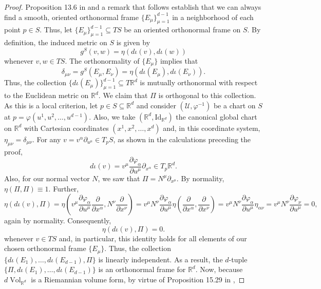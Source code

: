 \documentclass{article}
\newcommand{\p}{\partial}
\newcommand{\R}{\mathbb{R}}
\newcommand{\al}{\alpha}
\newcommand{\f}[2]{\frac{#1}{#2}}
\newcommand{\lp}{\left(}
\newcommand{\rp}{\right)}
\theoremstyle{theorem}
\newcommand{\Vol}{\operatorname{Vol}}
\begin{document}
\begin{proof}


Proposition 13.6 in \cite{lee2013smooth} and a remark that follows establish that we can always find a smooth, oriented orthonormal frame $\{ E_\mu \}_{\mu = 1}^{d-1}$ in a neighborhood of each point  $p\in S$. Thus, let $\{ E_\mu \}_{\mu = 1}^{d-1}\subseteq TS$ be an oriented orthonormal frame on $S$. By definition, the induced metric on $S$ is given by 
\begin{equation*}
    g^S(v,w) = \eta(d\iota (v), d\iota(w))
\end{equation*}
whenever $v,w\in TS$. The orthonormality of $\{E_\mu\}$ implies that 
\begin{equation*}
    \delta_{\mu\nu} = g^S(E_\mu,E_\nu) = \eta(d\iota(E_\mu), d\iota(E_\nu)).
\end{equation*}
Thus, the collection $\{ d\iota(E_\mu) \}_{\mu = 1}^{d-1}\subseteq T\R^d$ is mutually orthonormal with respect to the Euclidean metric on $\mathbb{R}^d$. We claim that $\Pi$ is orthogonal to this collection. As this is a local criterion, let $p\in S\subseteq\mathbb{R}^d$ and consider $(\mathcal{U},\varphi^{-1})$ be a chart on $S$ at $p=\varphi(u^1,u^2,\dots,u^{d-1})$. Also, we take $(\mathbb{R}^d,\mbox{Id}_{\mathbb{R}^d})$ the canonical global chart on $\mathbb{R}^d$ with Cartesian coordinates $(x^1,x^2,\dots,x^d)$ and, in this coordinate system, $\eta_{\mu\nu}=\delta_{\mu\nu}$. For any $v=v^\alpha\partial_{u^{\mu}}\in T_pS$, as shown in the calculations preceding the proof,
\begin{equation*}
d\iota(v)=v^{\mu}\frac{\partial\varphi_\al}{\partial u^\mu}\partial_{x^{\al}}\in T_p\mathbb{R}^d.
\end{equation*}
Also, for our normal vector $N$, we saw that $\Pi=N^{\mu}\partial_{x^\mu}$. By normality, $\eta(\Pi,\Pi)\equiv 1$. Further,
\begin{equation*}
    \eta(d\iota(v) , \Pi) = \eta\lp v^\mu\f{\p \varphi_\al }{ \p u^\mu} \f{\p}{\p x^\al}, N^\nu \f{\p}{\p x^\nu} \rp =  v^\mu N^\nu \f{\p \varphi_\al }{ \p u^\mu} \eta\lp \f{\p}{\p x^\alpha}, \f{\p}{\p x^\nu} \rp
    = v^\mu N^\nu \f{\p \varphi_\al }{ \p u^\mu} \eta_{\alpha\nu} = v^\mu N^\nu \f{\p \varphi_\nu }{ \p u^\mu} = 0,
\end{equation*}
again by normality. Consequently,
\begin{equation*}
    \eta(d\iota(v), \Pi) = 0.
\end{equation*}
whenever $v\in TS$ and, in particular, this identity holds for all elements of our chosen orthonormal frame $\{E_\mu\}$. Thus, the collection $\{ d\iota(E_1),\dots,d\iota(E_{d-1}),\Pi\}$ is linearly independent. As a result, the $d$-tuple $\{\Pi, d\iota(E_1),\dots, d\iota(E_{d-1})\}$ is an orthonormal frame for $\mathbb{R}^d$. Now, because $d\Vol_{\R^d}$ is a Riemannian volume form, by virtue of Proposition 15.29 in \cite{lee2013smooth}, 

\end{proof}
\end{document}
